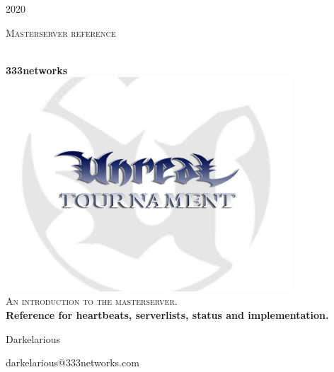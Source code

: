 \begin{titlepage}
\begin{center}
\begin{minipage}{0.45\textwidth}
  \begin{flushleft}
\textsc{2020}
  \end{flushleft}
\end{minipage}
\begin{minipage}{0.45\textwidth}
  \begin{flushright}
\textsc{Masterserver reference}
  \end{flushright}
\end{minipage}\\[3cm]
{\large \bfseries 333networks}\\[1.8cm]
\includegraphics[width=0.8\textwidth]{./img/utlogo}\\[2cm]
\textsc{\large An introduction to the masterserver. }\\[3cm]
{\Large \bf Reference for heartbeats, serverlists, status and implementation.}
\vfill
\begin{minipage}{0.45\textwidth}
  \begin{flushleft}
Darkelarious\\
  \end{flushleft}
\end{minipage}
\begin{minipage}{0.45\textwidth}
  \begin{flushright}
darkelarious@333networks.com\\
  \end{flushright}
\end{minipage}\\[1cm]
\end{center}
\end{titlepage}
